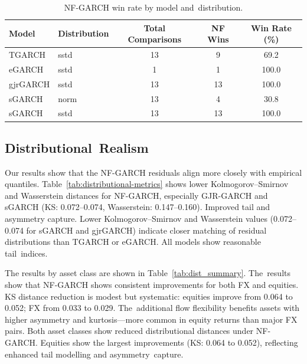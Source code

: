\documentclass[risks,article,accept,pdftex,moreauthors]{Definitions/mdpi}
\begin{document}
\begin{table}[H]


\caption{NF-GARCH win rate by model and~distribution.}
\label{tab:nf-win-rate}
\small

\begin{tabularx}{\linewidth}{LLcCC}
\toprule
\textbf{Model} & \textbf{Distribution} & \textbf{Total} \textbf{Comparisons} & \textbf{NF Wins} & \textbf{Win Rate (\%)} \\
\midrule
TGARCH   & sstd & 13 & 9 & 69.2 \\
eGARCH   & sstd & 1 & 1 & 100.0 \\
gjrGARCH & sstd & 13 & 13 & 100.0 \\
sGARCH   & norm & 13 & 4 & 30.8 \\
sGARCH   & sstd & 13 & 13 & 100.0 \\
\bottomrule
\end{tabularx}
\end{table}
\unskip


\subsection{Distributional~Realism}
\label{sec:dist_realism}

Our results show that the NF-GARCH residuals align more closely with empirical quantiles. Table~\ref{tab:distributional-metrics} shows lower Kolmogorov--Smirnov and Wasserstein distances for NF-GARCH, especially GJR-GARCH and sGARCH (KS: 0.072–0.074, Wasserstein: 0.147–0.160). Improved tail and asymmetry capture. Lower Kolmogorov--Smirnov and Wasserstein values (0.072–0.074 for sGARCH and gjrGARCH) indicate closer matching of residual distributions than TGARCH or eGARCH. All models show reasonable tail~indices.

The results by asset class are shown in Table~\ref{tab:dist_summary}. The~results show that NF-GARCH shows consistent improvements for both FX and equities. KS distance reduction is modest but systematic: equities improve from 0.064 to 0.052; FX from 0.033 to 0.029. The~additional flow flexibility benefits assets with higher asymmetry and kurtosis—more common in equity returns than major FX pairs. Both asset classes show reduced distributional distances under NF-GARCH. Equities show the largest improvements (KS: 0.064 to 0.052), reflecting enhanced tail modelling and asymmetry~capture.
\end{document}
